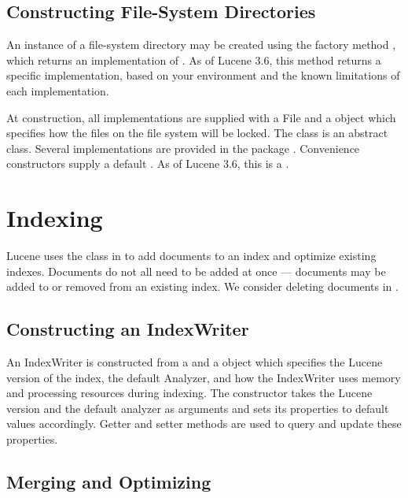 \subsection{Constructing File-System Directories}

An instance of a file-system directory may be created using the
factory method , which returns an
implementation of .
As of Lucene 3.6, this method returns a specific 
 implementation,
based on your environment and the
known limitations of each implementation.

At construction, all  implementations are 
supplied with a File and a  object which
specifies how the files on the file system will be locked.
The  class is an abstract class.
Several implementations are provided in the package
.
Convenience constructors supply a default .
As of Lucene 3.6, this is a
.


\section{Indexing}

Lucene uses the  class in
 to add documents to an index and
optimize existing indexes.  Documents do not all need to be added at
once --- documents may be added to or removed from an existing index.
We consider deleting documents in .

\subsection{Constructing an IndexWriter}

An IndexWriter is constructed from a  and
a  object which specifies the Lucene version
of the index, the default Analyzer, and how the IndexWriter uses
memory and processing resources during indexing.  The
 constructor takes the Lucene version and the
default analyzer as arguments and sets its properties to default
values accordingly.  Getter and setter methods are used to query and
update these properties.

\subsection{Merging and Optimizing}

